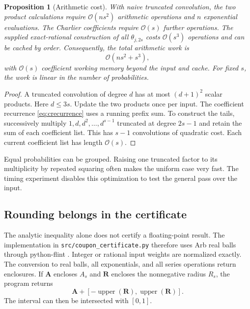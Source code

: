 \documentclass[11pt,a4paper]{article}
\newtheorem{proposition}[theorem]{Proposition}
\theoremstyle{definition}
\newcommand{\bigO}{\mathcal O}
\begin{document}
\begin{proposition}[Arithmetic cost]\label{prop:cost}
With naive truncated convolution, the two product calculations require
$\bigO(ns^2)$ arithmetic operations and $n$ exponential evaluations.
The Charlier coefficients require $\bigO(s)$ further operations.
The supplied exact-rational construction of all $\theta_{j,2s}$ costs
$\bigO(s^3)$ operations and can be cached by order. Consequently, the
total arithmetic work is
\begin{equation}\label{eq:cost}
 \bigO(ns^2+s^3),
\end{equation}
with $\bigO(s)$ coefficient working memory beyond the input and cache.
For fixed $s$, the work is linear in the number of probabilities.
\end{proposition}
\begin{proof}
A truncated convolution of degree $d$ has at most $(d+1)^2$
scalar products. Here $d\le3s$. Update the two products once per
input. The coefficient recurrence \eqref{eq:crecurrence} uses a
running prefix sum. To construct the tails, successively multiply
$1,d,d^2,\ldots,d^{s-1}$ truncated at degree $2s-1$ and retain
the sum of each coefficient list. This has $s-1$ convolutions of
quadratic cost. Each current coefficient list has length $\bigO(s)$.
\end{proof}

Equal probabilities can be grouped. Raising one truncated factor to its
multiplicity by repeated squaring often makes the uniform case very
fast. The timing experiment disables this optimization to test the
general pass over the input.

\subsection{Rounding belongs in the certificate}

The analytic inequality alone does not certify a floating-point result.
The implementation in \texttt{src/coupon\_certificate.py} therefore uses
Arb real balls through python-flint \cite{PythonFlint090,Johansson2017}.
Integer or rational input weights are normalized exactly. The conversion
to real balls, all exponentials, and all series operations return
enclosures. If $\boldsymbol A$ encloses $A_s$ and
$\boldsymbol R$ encloses the nonnegative radius $R_s$, the program returns
\begin{equation}\label{eq:rounding}
 \boldsymbol A+[-\operatorname{upper}(\boldsymbol R),
                 \operatorname{upper}(\boldsymbol R)].
\end{equation}
The interval can then be intersected with $[0,1]$.
\end{document}
